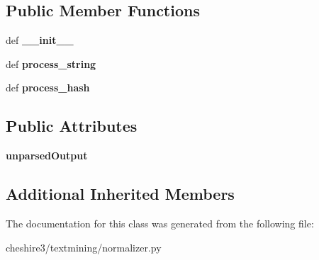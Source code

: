 \subsection*{Public Member Functions}
\begin{DoxyCompactItemize}
\item 
\hypertarget{classcheshire3_1_1textmining_1_1normalizer_1_1_genia_normalizer_af9c41eb03a0b4323471904c217089fc4}{def {\bfseries \-\_\-\-\_\-init\-\_\-\-\_\-}}\label{classcheshire3_1_1textmining_1_1normalizer_1_1_genia_normalizer_af9c41eb03a0b4323471904c217089fc4}

\item 
\hypertarget{classcheshire3_1_1textmining_1_1normalizer_1_1_genia_normalizer_a0f2b5dd2c5766c7fd8737eb65becb135}{def {\bfseries process\-\_\-string}}\label{classcheshire3_1_1textmining_1_1normalizer_1_1_genia_normalizer_a0f2b5dd2c5766c7fd8737eb65becb135}

\item 
\hypertarget{classcheshire3_1_1textmining_1_1normalizer_1_1_genia_normalizer_a84d61cdc14e7ab8e4c3672b8dda67ebd}{def {\bfseries process\-\_\-hash}}\label{classcheshire3_1_1textmining_1_1normalizer_1_1_genia_normalizer_a84d61cdc14e7ab8e4c3672b8dda67ebd}

\end{DoxyCompactItemize}
\subsection*{Public Attributes}
\begin{DoxyCompactItemize}
\item 
\hypertarget{classcheshire3_1_1textmining_1_1normalizer_1_1_genia_normalizer_a23a7f38099c9f294b0bb6a62aeff4c5d}{{\bfseries unparsed\-Output}}\label{classcheshire3_1_1textmining_1_1normalizer_1_1_genia_normalizer_a23a7f38099c9f294b0bb6a62aeff4c5d}

\end{DoxyCompactItemize}
\subsection*{Additional Inherited Members}


The documentation for this class was generated from the following file\-:\begin{DoxyCompactItemize}
\item 
cheshire3/textmining/normalizer.\-py\end{DoxyCompactItemize}

